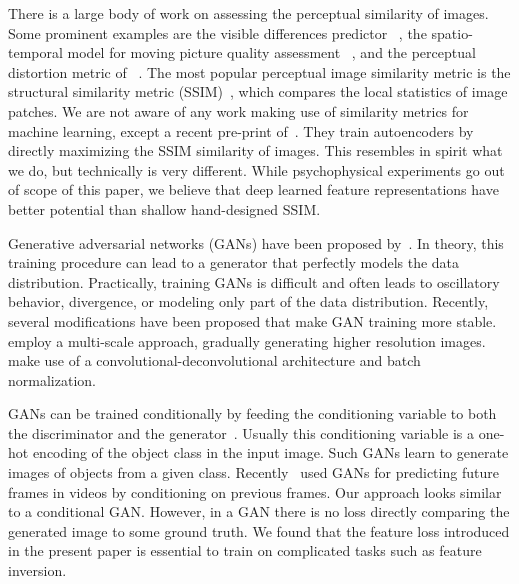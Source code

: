 \documentclass{article}
\newcommand{\tca}[1]{\textcolor{alexey}{#1}}    %
\begin{document}
There is a large body of work on assessing the perceptual similarity of images.
Some prominent examples are the visible differences predictor ~\citep{Daly_1993}, the spatio-temporal model for moving picture quality assessment ~\citep{Lambrecht_1996}, and the perceptual distortion metric of ~\citet{Winkler_1998}.
The most popular perceptual image similarity metric is the structural similarity metric (SSIM)~\citep{Wang_2004}, which compares the local statistics of image patches.
We are not aware of any work making use of similarity metrics for machine learning, except a recent pre-print of~\citet{Ridgeway_arxiv15}.
They train autoencoders by directly maximizing the SSIM similarity of images.
This resembles in spirit what we do, but technically is very different. 
While psychophysical experiments go out of scope of this paper, we believe that deep learned feature representations have better potential than shallow hand-designed SSIM.

Generative adversarial networks (GANs) have been proposed by~\citet{Goodfellow_NIPS2014}.
In theory, this training procedure can lead to a generator that perfectly models the data distribution.
Practically, training GANs is difficult and often leads to oscillatory behavior, divergence, or modeling only part of the data distribution.
Recently, several modifications have been proposed that make GAN training more stable.
\citet{Denton_NIPS2015} employ a multi-scale approach, gradually generating higher resolution images.
\citet{Radford_arxiv2015} make use of a convolutional-deconvolutional architecture and batch normalization.

GANs can be trained conditionally by feeding the conditioning variable to both the discriminator and the generator~\citep{Mirza_2014}.
Usually this conditioning variable is a one-hot encoding of the object class in the input image.
Such GANs learn to generate images of objects from a given class.
Recently~\citet{Mathieu_arxiv2015} used GANs for predicting future frames in videos by conditioning on previous frames.
Our approach looks similar to a conditional GAN. 
However, in a GAN there is no loss directly comparing the generated image to some ground truth.
We found that the feature loss introduced in the present paper is essential to train on complicated tasks such as feature inversion.
\end{document}
